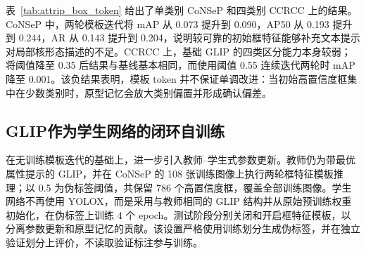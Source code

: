 表~\ref{tab:attrip_box_token} 给出了单类别 CoNSeP 和四类别 CCRCC 上的结果。CoNSeP 中，两轮模板迭代将 mAP 从 0.073 提升到 0.090，AP50 从 0.193 提升到 0.244，AR 从 0.143 提升到 0.204，说明较可靠的初始框特征能够补充文本提示对局部核形态描述的不足。CCRCC 上，基础 GLIP 的四类区分能力本身较弱；将阈值降至 0.35 后结果与基线基本相同，而使用阈值 0.55 连续迭代两轮时 mAP 降至 0.001。该负结果表明，模板 token 并不保证单调改进：当初始高置信度框集中在少数类别时，原型记忆会放大类别偏置并形成确认偏差。

\begin{table}[htbp]
\centering
\caption{检测框特征模板迭代结果}
\label{tab:attrip_box_token}
\end{table}

\subsection{GLIP作为学生网络的闭环自训练}

在无训练模板迭代的基础上，进一步引入教师--学生式参数更新。教师仍为带最优属性提示的 GLIP，并在 CoNSeP 的 108 张训练图像上执行两轮框特征模板推理；以 0.5 为伪标签阈值，共保留 786 个高置信度框，覆盖全部训练图像。学生网络不再使用 YOLOX，而是采用与教师相同的 GLIP 结构并从原始预训练权重初始化，在伪标签上训练 4 个 epoch。测试阶段分别关闭和开启框特征模板，以分离参数更新和原型记忆的贡献。该设置严格使用训练划分生成伪标签，并在独立验证划分上评价，不读取验证标注参与训练。

